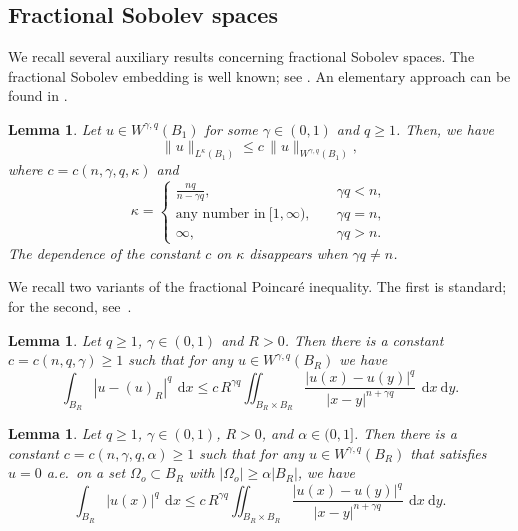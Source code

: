 \documentclass[10pt,letterpaper]{amsart}
\newtheorem{lemma}[theorem]{Lemma}
\theoremstyle{definition}
\numberwithin{theorem}{section}
\numberwithin{equation}{section}
\newcommand{\1}{\ensuremath{\mathds{1}}}
\renewcommand{\d}{\:\! \mathrm{d}}
\numberwithin{equation}{section}
\begin{document}
\subsection{Fractional Sobolev spaces}\label{sec:fractional}
\noindent
We recall several auxiliary results concerning fractional Sobolev spaces. 
The fractional Sobolev embedding is well known; see \cite[Chapter~7]{Adams-75}. An elementary approach can be found in \cite{Hitchhikers-guide}.
\begin{lemma}\label{lem:Sobolev}
Let $u\in W^{\gamma,q}(B_1)$ for some $\gamma\in(0,1)$ and $q\ge1$.
Then, we have
\begin{equation*}%
    \|u\|_{L^{\kappa}(B_1)}
    \le 
    c\, \|u\|_{W^{\gamma,q}(B_1)},
\end{equation*}
where $c=c(n,\gamma,q,\kappa)$ and 
\begin{equation}\label{def:kappa}
\kappa = \left\{
\begin{array}{cl}
\frac{nq}{n-\gamma q},\quad  &\gamma q<n,\\[5pt]
\text{any number in} \> [1,\infty),\quad &\gamma q= n,  \\[5pt]
\infty,\quad &\gamma q>n.
\end{array}
\right.
\end{equation}
The dependence of the constant $c$ on $\kappa$ disappears when $\gamma q\neq n$.
\end{lemma}
 


We recall two variants of the fractional Poincaré inequality. The first is standard; for the second, see~\cite[Lemma 4.7]{Coz17b}.


\begin{lemma}\label{lem:poin}
Let $q \geq 1$, $\gamma \in(0, 1)$ and $R > 0$. Then there is a constant $c=c(n,q,\gamma)\ge 1$ such that for any 
$u \in W^{\gamma,q}(B_R)$ we have
\begin{equation*}
    \int_{B_R} |u-(u)_{R}|^q \, \d x 
    \leq c\,  R^{\gamma q}  \iint_{B_R\times B_R} \frac{|u(x) - u(y)|^q}{|x-y|^{n+\gamma q}} \, \d x \d y.
\end{equation*}
\end{lemma}

\begin{lemma} \label{lem:coz17b-4.7}
Let $q \geq 1$, $\gamma \in(0, 1)$,
$R > 0$, and $\alpha \in (0,1]$. Then there is a constant $c = c(n,\gamma,q,\alpha) \geq 1$ such that
for any $u \in W^{\gamma,q}(B_R)$ that satisfies $u = 0$ a.e.~on a set $\Omega_o \subset B_R$ with $|\Omega_o| \geq \alpha |B_R|$, we have
\begin{equation*}
    \int_{B_R} |u(x)|^q \, \d x 
    \leq 
    c\,   R^{\gamma q} \iint_{B_R \times B_R} \frac{|u(x)-u(y)|^q}{|x-y|^{n+\gamma q}} \, \d x \d y.
\end{equation*}
\end{lemma}
\end{document}
